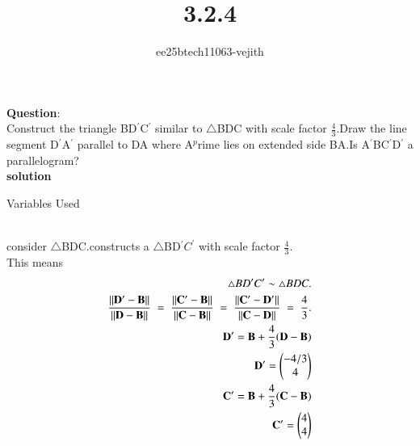 \documentclass[journal]{IEEEtran}
\begin{document}

\vspace{3cm}

\title{3.2.4}
\author{ee25btech11063-vejith}

\maketitle
{\let\newpage\relax\maketitle}
\renewcommand{\thefigure}{\theenumi}
\renewcommand{\thetable}{\theenumi}
\setlength{\intextsep}{10pt} %
\textbf{Question}:\\
Construct the triangle BD$^{\prime}$C$^{\prime}$ similar to $\triangle$BDC with scale factor $\frac{4}{3}$.Draw the line segment D$^{\prime}$A$^{\prime}$ parallel to DA where A$^p$rime lies on extended side BA.Is A$^{\prime}$BC$^{\prime}$D$^{\prime}$ a parallelogram?\\ 
\textbf{solution}
\begin{table}[h!]    
  \centering
  
  \caption{Variables Used}
  \label{}
\end{table}\\
consider $\triangle$BDC.constructs a $\triangle$BD$^{\prime}C^{\prime}$
 with scale factor $\frac{4}{3}$.\\
This means 
\begin{align}
  \triangle BD^{\prime}C^{\prime} \sim \triangle BDC.\\
\frac{\norm{\vec{D^{\prime}}-\vec{B}}}{\norm{\vec{D}-\vec{B}}} \;=\; \frac{\norm{\vec{C^{\prime}}-\vec{B}}}{\norm{\vec{C}-\vec{B}}} \;=\; \frac{\norm{\vec{C^{\prime}}-\vec{D^{\prime}}}}{\norm{\vec{C}-\vec{D}}} \;=\; \frac{4}{3}.\\
\Vec{D^{\prime}}=\Vec{B}+\frac{4}{3}(\Vec{D}-\Vec{B})\\
\Vec{D^{\prime}}=\myvec{-4/3\\4}\\
\Vec{C^{\prime}}=\Vec{B}+\frac{4}{3}(\Vec{C}-\Vec{B})\\
\Vec{C^{\prime}}=\myvec{4\\4}
\end{align}
\end{document}
